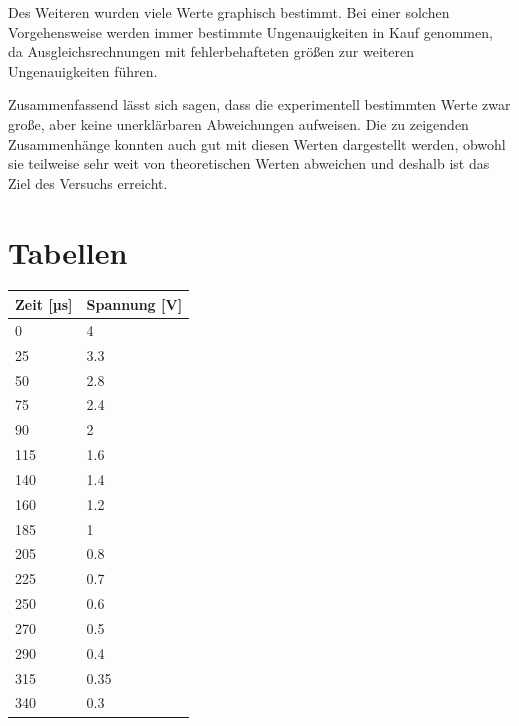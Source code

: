 \documentclass[titlepage=firstcover, captions=tableheading]{scrartcl}
\begin{document}
\noindent Des Weiteren wurden viele Werte graphisch bestimmt.
Bei einer solchen Vorgehensweise werden immer bestimmte Ungenauigkeiten in Kauf genommen, 
da Ausgleichsrechnungen mit fehlerbehafteten größen zur weiteren Ungenauigkeiten führen.

\noindent Zusammenfassend lässt sich sagen, dass die experimentell bestimmten Werte zwar große,
aber keine unerklärbaren Abweichungen aufweisen.
Die zu zeigenden Zusammenhänge konnten auch gut mit diesen Werten dargestellt werden,
obwohl sie teilweise sehr weit von theoretischen Werten abweichen 
und deshalb ist das Ziel des Versuchs erreicht.


\section{Tabellen}

\begin{minipage}{\linewidth}
\begin{table}[H]
    \centering

\begin{tabular}{ll}
    \toprule
    Zeit [µs] & Spannung [V]\\
    \midrule
    0     & 4    \\   
    25    & 3.3  \\  
    50    & 2.8  \\  
    75    & 2.4  \\   
    90    & 2    \\   
    115   & 1.6  \\  
    140   & 1.4  \\   
    160   & 1.2  \\   
    185   & 1    \\   
    205   & 0.8  \\  
    225   & 0.7  \\  
    250   & 0.6  \\  
    270   & 0.5  \\  
    290   & 0.4  \\  
    315   & 0.35 \\   
    340   & 0.3  \\   
    \bottomrule
    
\end{tabular}
\label{tab:5a}
\end{table}
\end{minipage}
\end{document}
